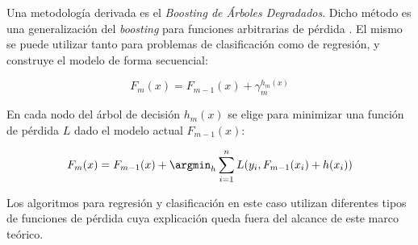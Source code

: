 Una metodología derivada es el \emph{Boosting de Árboles Degradados}. Dicho método es una generalización del \emph{boosting} para funciones arbitrarias de pérdida \cite{smolyakov}. El mismo se puede utilizar tanto para problemas de clasificación como de regresión, y construye el modelo de forma secuencial:

\[ F_m(x) = F_{m-1}(x) + \gamma_m^{h_m(x)} \]

En cada nodo del árbol de decisión \(h_m(x)\) se elige para minimizar una función de pérdida \(L\) dado el modelo actual \(F_{m-1}(x)\):

\[ F_m(x) = F_{m-1}(x) + \argmin_h \sum_{i=1}^n L(y_i, F_{m-1}(x_i) + h(x_i) )\]

Los algoritmos para regresión y clasificación en este caso utilizan diferentes tipos de funciones de pérdida cuya explicación queda fuera del alcance de este marco teórico.
